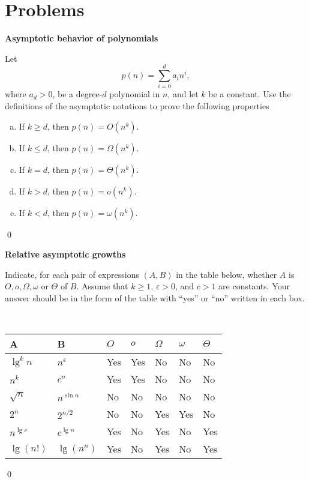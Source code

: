 \section{Problems}

 \textbf{Asymptotic behavior of polynomials}

Let $$p(n) = \sum_{i=0}^d a_i n^i,$$ where $a_d > 0$, be a degree-$d$ polynomial in $n$, and let $k$ be a constant. Use the definitions of the asymptotic notations to prove the following properties

\begin{enumerate}[(a)]
    \item If $k \geq d$, then $p(n) = O(n^k)$.
    \item If $k \leq d$, then $p(n) = \Omega(n^k)$.
    \item If $k = d$, then $p(n) = \Theta(n^k)$.
    \item If $k > d$, then $p(n) = o(n^k)$.
    \item If $k < d$, then $p(n) = \omega(n^k)$.
\end{enumerate}

\sol \qed

 \textbf{Relative asymptotic growths}

Indicate, for each pair of expressions $(A,B)$ in the table below, whether $A$ is $O, o, \Omega, \omega$ or $\Theta$ of $B$. Assume that $k \geq 1, \, \varepsilon > 0$, and $c > 1$ are constants. Your answer should be in the form of the table with ``yes'' or ``no'' written in each box.

\,

\begin{center}
\begin{tabular}{|l|l||l|l|l|l|l|}
    \hline
    A           & B                 & $O$ & $o$ & $\Omega$ & $\omega$ & $\Theta$ \\\hline\hline
    $\lg^k n$   & $n^{\varepsilon}$ &  Yes   & Yes    &  No        &   No       &   No                      \\\hline
    $n^k$       & $c^n$             &   Yes  &  Yes   &  No        &  No        &   No                      \\\hline
    $\sqrt{n}$  & $n^{\sin n}$      &   No  & No    &   No       & No         &  No                       \\\hline
    $2^n$       & $2^{n/2}$         &  No   &  No   & Yes         & Yes         & No                        \\\hline
    $n^{\lg c}$ & $c^{\lg n}$       &  Yes   & No    &  Yes        &   No       & Yes                        \\\hline
    $\lg(n!)$   & $\lg(n^n)$        &  Yes   &  No   &   Yes       &   No       &  Yes                      \\\hline
\end{tabular}
\end{center}
\qed

